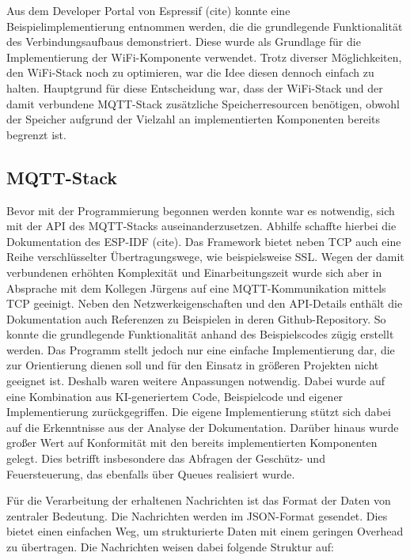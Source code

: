 Aus dem Developer Portal von Espressif (cite) konnte eine Beispielimplementierung entnommen werden, die die grundlegende Funktionalität des Verbindungsaufbaus demonstriert. Diese wurde als Grundlage für die Implementierung der WiFi-Komponente verwendet. Trotz diverser Möglichkeiten, den WiFi-Stack noch zu optimieren, war die Idee diesen dennoch einfach zu halten. Hauptgrund für diese Entscheidung war, dass der WiFi-Stack und der damit verbundene MQTT-Stack zusätzliche Speicherresourcen benötigen, obwohl der Speicher aufgrund der Vielzahl an implementierten Komponenten bereits begrenzt ist. \newline

\subsection{MQTT-Stack}

Bevor mit der Programmierung begonnen werden konnte war es notwendig, sich mit der API des MQTT-Stacks auseinanderzusetzen. Abhilfe schaffte hierbei die Dokumentation des ESP-IDF (cite). Das Framework bietet neben TCP auch eine Reihe verschlüsselter Übertragungswege, wie beispielsweise SSL. Wegen der damit verbundenen erhöhten Komplexität und Einarbeitungszeit wurde sich aber in Absprache mit dem Kollegen Jürgens auf eine MQTT-Kommunikation mittels TCP geeinigt. Neben den Netzwerkeigenschaften und den API-Details enthält die Dokumentation auch Referenzen zu Beispielen in deren Github-Repository. So konnte die grundlegende Funktionalität anhand des Beispielscodes zügig erstellt werden. Das Programm stellt jedoch nur eine einfache Implementierung dar, die zur Orientierung dienen soll und für den Einsatz in größeren Projekten nicht geeignet ist. Deshalb waren weitere Anpassungen notwendig. Dabei wurde auf eine Kombination aus KI-generiertem Code, Beispielcode und eigener Implementierung zurückgegriffen. Die eigene Implementierung stützt sich dabei auf die Erkenntnisse aus der Analyse der Dokumentation. Darüber hinaus wurde großer Wert auf Konformität mit den bereits implementierten Komponenten gelegt. Dies betrifft insbesondere das Abfragen der Geschütz- und Feuersteuerung, das ebenfalls über Queues realisiert wurde. \newline

Für die Verarbeitung der erhaltenen Nachrichten ist das Format der Daten von zentraler Bedeutung. Die Nachrichten werden im JSON-Format gesendet. Dies bietet einen einfachen Weg, um strukturierte Daten mit einem geringen Overhead zu übertragen. Die Nachrichten weisen dabei folgende Struktur auf:

